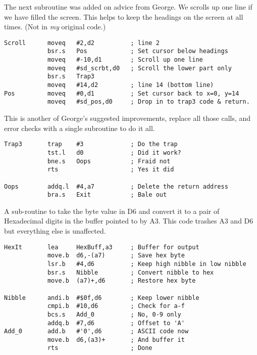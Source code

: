 The next subroutine was added on advice from George. We scrolls up one line if we have filled the screen. This helps to keep the headings on the screen at all times. (Not in \emph{my} original code.)

\begin{lstlisting}[firstnumber=last,caption={Pointer Record Examiner - Scroll Screen}]
Scroll      moveq   #2,d2          ; line 2
            bsr.s   Pos            ; Set cursor below headings
            moveq   #-10,d1        ; Scroll up one line
            moveq   #sd_scrbt,d0   ; Scroll the lower part only
            bsr.s   Trap3
            moveq   #14,d2         ; line 14 (bottom line)
Pos         moveq   #0,d1          ; Set cursor back to x=0, y=14
            moveq   #sd_pos,d0     ; Drop in to trap3 code & return.
\end{lstlisting}

This is another of George's suggested improvements, replace all those  calls, and error checks with a single subroutine to do it all.

\begin{lstlisting}[firstnumber=last,caption={Pointer Record Examiner - Handle TRAPs}]
Trap3       trap    #3             ; Do the trap
            tst.l   d0             ; Did it work?
            bne.s   Oops           ; Fraid not
            rts                    ; Yes it did

Oops        addq.l  #4,a7          ; Delete the return address
            bra.s   Exit           ; Bale out
\end{lstlisting}

A sub-{}routine to take the byte value in D6 and convert it to a pair of Hexadecimal digits
in the buffer pointed to by A3. This code trashes A3 and D6 but everything else is
unaffected.

\begin{lstlisting}[firstnumber=last,caption={Pointer Record Examiner - Print Hexadecimal}]
HexIt       lea     HexBuff,a3     ; Buffer for output
            move.b  d6,-(a7)       ; Save hex byte
            lsr.b   #4,d6          ; Keep high nibble in low nibble
            bsr.s   Nibble         ; Convert nibble to hex
            move.b  (a7)+,d6       ; Restore hex byte

Nibble      andi.b  #$0f,d6        ; Keep lower nibble
            cmpi.b  #10,d6         ; Check for a-f
            bcs.s   Add_0          ; No, 0-9 only
            addq.b  #7,d6          ; Offset to 'A'
Add_0       add.b   #'0',d6        ; ASCII code now
            move.b  d6,(a3)+       ; And buffer it
            rts                    ; Done
\end{lstlisting}


